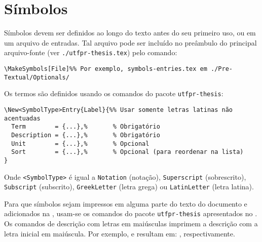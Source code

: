 \section{Símbolos}%
\label{sect:sym}

Símbolos devem ser definidos ao longo do texto antes do seu primeiro uso, ou em um arquivo de entradas.
Tal arquivo pode ser incluído no preâmbulo do principal arquivo-fonte (ver \texttt{./utfpr-thesis.tex}) pelo comando:

\begin{snugshade}
\begin{Verbatim}
\MakeSymbols[File]%% Por exemplo, symbols-entries.tex em ./Pre-Textual/Optionals/
\end{Verbatim}
\end{snugshade}

Os termos são definidos usando os comandos do pacote \texttt{utfpr-thesis}:

\begin{snugshade}
\begin{Verbatim}
\New<SymbolType>Entry{Label}{%% Usar somente letras latinas não acentuadas
  Term        = {...},%       % Obrigatório
  Description = {...},%       % Obrigatório
  Unit        = {...},%       % Opcional
  Sort        = {...},%       % Opcional (para reordenar na lista)
}
\end{Verbatim}
\end{snugshade}

\noindent Onde \texttt{<SymbolType>} é igual a \texttt{Notation} (notação), \texttt{Superscript} (sobrescrito), \texttt{Subscript} (subscrito), \texttt{GreekLetter} (letra grega) ou \texttt{LatinLetter} (letra latina).

Para que símbolos sejam impressos em alguma parte do texto do documento e adicionados na \symref, usam-se os comandos do pacote \texttt{utfpr-thesis} apresentados no .
Os comandos de descrição com letras em maiúsculas imprimem a descrição com a letra inicial em maiúscula.
Por exemplo,  e  resultam em: , respectivamente.

